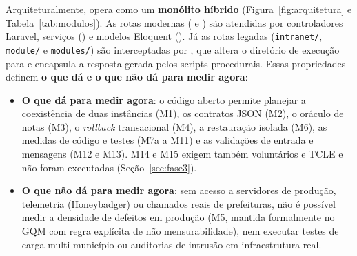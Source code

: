 \documentclass[conference]{model/IEEEtran}%
\begin{document}
Arquiteturalmente, opera como um \textbf{monólito híbrido} (Figura~\ref{fig:arquitetura} e Tabela~\ref{tab:modulos}). As rotas modernas ( e ) são atendidas por controladores Laravel, serviços () e modelos Eloquent (). Já as rotas legadas (\texttt{intranet/}, \texttt{module/} e \texttt{modules/}) são interceptadas por , que altera o diretório de execução para  e encapsula a resposta gerada pelos scripts procedurais. Essas propriedades definem \textbf{o que dá e o que não dá para medir agora}:
\begin{itemize}
  \item \textbf{O que dá para medir agora}: o código aberto permite planejar a coexistência de duas instâncias (M1), os contratos JSON (M2), o oráculo de notas (M3), o \textit{rollback} transacional (M4), a restauração isolada (M6), as medidas de código e testes (M7a a M11) e as validações de entrada e mensagens (M12 e M13). M14 e M15 exigem também voluntários e TCLE e não foram executadas (Seção~\ref{sec:fase3}).
  \item \textbf{O que não dá para medir agora}: sem acesso a servidores de produção, telemetria (Honeybadger) ou chamados reais de prefeituras, não é possível medir a densidade de defeitos em produção (M5, mantida formalmente no GQM com regra explícita de não mensurabilidade), nem executar testes de carga multi-município ou auditorias de intrusão em infraestrutura real.
\end{itemize}
\end{document}
